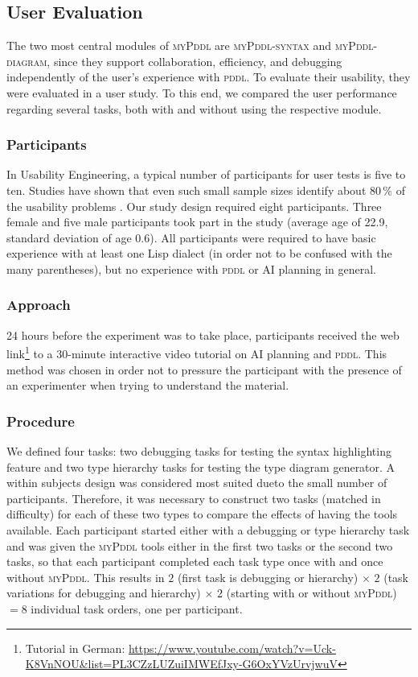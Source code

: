 \documentclass[runningheads]{llncs}
\newcommand{\mypddl}{\textsc{myPddl}\xspace}
\newcommand{\mypddlsyntax}{\textsc{myPddl-syntax}\xspace}
\newcommand{\mypddldiagram}{\textsc{myPddl-diagram}\xspace}
\newcommand{\pddl}{\textsc{pddl}\xspace}
\begin{document}
\subsection{User Evaluation}

The two most central modules of \mypddl are \mypddlsyntax and
\mypddldiagram, since they support collaboration, efficiency, and
debugging independently of the user’s experience with \pddl. To
evaluate their usability, they were evaluated in a user study. To this
end, we compared the user performance regarding several tasks, both
with and without using the respective module.

\subsubsection{Participants}

In Usability Engineering, a typical number of participants for user
tests is five to ten. Studies have shown that even such small sample
sizes identify about 80\,\% of the usability problems
\cite{nielsen1994estimating,hwang2010number}. Our study design
required eight participants. Three female and five male participants
took part in the study (average age of 22.9, standard deviation of age
0.6). All participants were required to have basic experience with at
least one Lisp dialect (in order not to be confused with the many
parentheses), but no experience with \pddl or AI planning in general.

\subsubsection{Approach}

24 hours before the experiment was to take place, participants
received the web
link\footnote{Tutorial in German: \url{https://www.youtube.com/watch?v=Uck-K8VnNOU&list=PL3CZzLUZuiIMWEfJxy-G6OxYVzUrvjwuV}} to a 30-minute interactive video tutorial
on AI planning and \pddl. This method was chosen in order not to
pressure the participant with the presence of an experimenter when
trying to understand the material.

\subsubsection{Procedure}

We defined four tasks: two debugging tasks for testing the syntax
highlighting feature and two type hierarchy tasks for testing the type
diagram generator. A within subjects design was considered most suited
dueto the small number of participants. Therefore, it was necessary to
construct two tasks (matched in difficulty) for each of these two
types to compare the effects of having the tools available. Each
participant started either with a debugging or type hierarchy task and
was given the \mypddl tools either in the first two tasks or the
second two tasks, so that each participant completed each task type
once with and once without \mypddl. This results in $2$ (first task is
debugging or hierarchy) $\times$ $2$ (task variations for debugging
and hierarchy) $\times$ $2$ (starting with or without \mypddl) $= 8$
individual task orders, one per participant.
\end{document}
